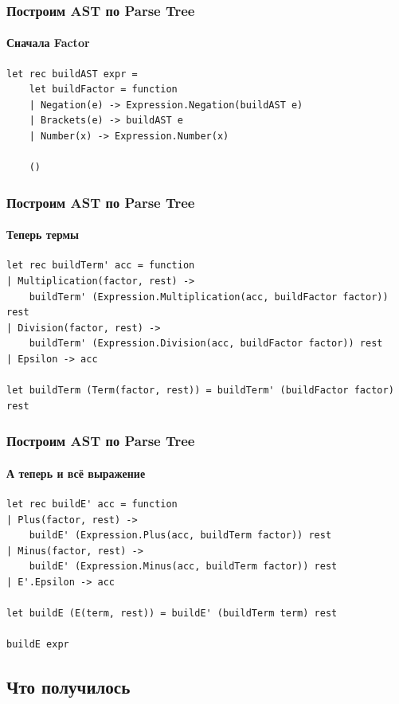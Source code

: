 \documentclass[xetex,mathserif,serif]{beamer}
\begin{document}
    \begin{frame}[fragile]
        \frametitle{Построим AST по Parse Tree}
        \framesubtitle{Сначала Factor}
        \begin{verbatim}
let rec buildAST expr =
    let buildFactor = function
    | Negation(e) -> Expression.Negation(buildAST e)
    | Brackets(e) -> buildAST e
    | Number(x) -> Expression.Number(x)

    ()
        \end{verbatim}
    \end{frame}

    \begin{frame}[fragile]
        \frametitle{Построим AST по Parse Tree}
        \framesubtitle{Теперь термы}
        \begin{verbatim}
let rec buildTerm' acc = function
| Multiplication(factor, rest) -> 
    buildTerm' (Expression.Multiplication(acc, buildFactor factor)) rest
| Division(factor, rest) -> 
    buildTerm' (Expression.Division(acc, buildFactor factor)) rest
| Epsilon -> acc

let buildTerm (Term(factor, rest)) = buildTerm' (buildFactor factor) rest
        \end{verbatim}
    \end{frame}

    \begin{frame}[fragile]
        \frametitle{Построим AST по Parse Tree}
        \framesubtitle{А теперь и всё выражение}
        \begin{verbatim}
let rec buildE' acc = function
| Plus(factor, rest) -> 
    buildE' (Expression.Plus(acc, buildTerm factor)) rest
| Minus(factor, rest) -> 
    buildE' (Expression.Minus(acc, buildTerm factor)) rest
| E'.Epsilon -> acc

let buildE (E(term, rest)) = buildE' (buildTerm term) rest

buildE expr
        \end{verbatim}
    \end{frame}

    \subsection{Что получилось}
\end{document}
